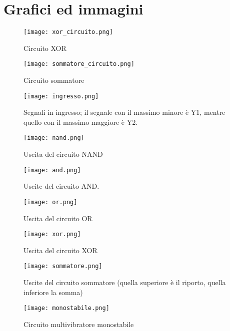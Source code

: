 \section{Grafici ed immagini}

\begin{figure}[h]
	\centering
	\texttt{[image: xor\_circuito.png]}
	\caption{Circuito XOR}
	\label{f:xor_circuito}
\end{figure}

\begin{figure}[h]
	\centering
	\texttt{[image: sommatore\_circuito.png]}
	\caption{Circuito sommatore}
	\label{f:sommatore_circuito}
\end{figure}

\begin{figure}[h]
	\centering
	\texttt{[image: ingresso.png]}
	\caption{Segnali in ingresso; il segnale con il massimo minore è Y1, mentre quello con il massimo maggiore è Y2.}
	\label{f:ingressi}
\end{figure}

\begin{figure}[h]
	\centering
	\texttt{[image: nand.png]}
	\caption{Uscita del circuito NAND }
	\label{f:NAND}
\end{figure}

\begin{figure}[h]
	\centering
	\texttt{[image: and.png]}
	\caption{Uscite del circuito AND.}
	\label{f:AND}
\end{figure}

\begin{figure}[h]
	\centering
	\texttt{[image: or.png]}
	\caption{Uscita del circuito OR}
	\label{f:OR}
\end{figure}

\begin{figure}[h]
	\centering
	\texttt{[image: xor.png]}
	\caption{Uscita del circuito XOR}
	\label{f:XOR}
\end{figure}

\begin{figure}[h]
	\centering
	\texttt{[image: sommatore.png]}
	\caption{Uscite del circuito sommatore (quella superiore è il riporto, quella inferiore la somma)}
	\label{f:Sommatore}
\end{figure}


\begin{figure}[h]
	\centering
	\texttt{[image: monostabile.png]}
	\caption{Circuito multivibratore monostabile}
	\label{f:monostabile}
\end{figure}

